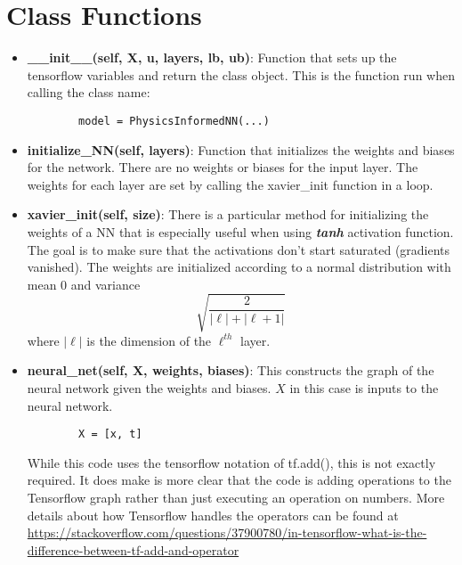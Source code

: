 \documentclass[10pt]{article}
\begin{document}
\section{Class Functions}
\begin{itemize}
    \item \textbf{\_\_init\_\_(self, X, u, layers, lb, ub)}: Function that sets up the tensorflow variables and return the class object. This is the function run when calling the class name:
    \begin{lstlisting}
        model = PhysicsInformedNN(...)
    \end{lstlisting}
    
    \item \textbf{initialize\_NN(self, layers)}: Function that initializes the weights and biases for the network. There are no weights or biases for the input layer. The weights for each layer are set by calling the xavier\_init function in a loop.
    \item \textbf{xavier\_init(self, size)}: There is a particular method for initializing the weights of a NN that is especially useful when using \textbf{\textit{tanh}} activation function. The goal is to make sure that the activations don't start saturated (gradients vanished). The weights are initialized according to a normal distribution with mean 0 and variance
    \begin{equation*}
        \sqrt{\frac{2}{|\ell| + |\ell+1|}}
    \end{equation*}
    where $|\ell|$ is the dimension of the $\ell^{th}$ layer.
    
    \item \textbf{neural\_net(self, X, weights, biases)}: This constructs the graph of the neural network given the weights and biases. $X$ in this case is inputs to the neural network.
    \begin{lstlisting}
        X = [x, t]
    \end{lstlisting}

    While this code uses the tensorflow notation of tf.add(), this is not exactly required. It does make is more clear that the code is adding operations to the Tensorflow graph rather than just executing an operation on numbers. More details about how Tensorflow handles the operators can be found at\\
    \underline{https://stackoverflow.com/questions/37900780/in-tensorflow-what-is-the-difference-between-tf-add-and-operator}\\


\end{itemize}
\end{document}
